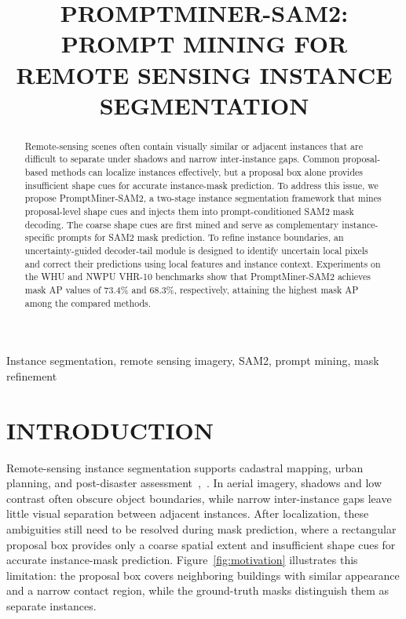 \documentclass{article}
\title{PROMPTMINER-SAM2: PROMPT MINING FOR\\REMOTE SENSING INSTANCE SEGMENTATION}
\begin{document}
\maketitle

\begin{abstract}
Remote-sensing scenes often contain visually similar or adjacent instances that are difficult to separate under shadows and narrow inter-instance gaps.
Common proposal-based methods can localize instances effectively, but a proposal box alone provides insufficient shape cues for accurate instance-mask prediction.
To address this issue, we propose PromptMiner-SAM2, 
a two-stage instance segmentation framework that mines proposal-level shape cues and injects them into prompt-conditioned SAM2 mask decoding.
The coarse shape cues are first mined and serve as complementary instance-specific prompts for SAM2 mask prediction. 
To refine instance boundaries, an uncertainty-guided decoder-tail module is designed to identify uncertain local pixels and correct their predictions using local features and instance context.
Experiments on the WHU and NWPU VHR-10 benchmarks show that PromptMiner-SAM2 achieves
mask AP values of 73.4\% and 68.3\%, respectively, attaining the highest mask AP among the compared
methods.
\end{abstract}
\begin{keywords}
Instance segmentation, remote sensing imagery, SAM2, prompt mining, mask refinement
\end{keywords}

\section{INTRODUCTION}

Remote-sensing instance segmentation supports cadastral mapping, urban planning, and post-disaster assessment~\cite{rsiisn},~\cite{p2pformer}. 
In aerial imagery, shadows and low contrast often obscure object boundaries, while narrow inter-instance gaps leave little visual separation between adjacent instances.
After localization, these ambiguities still need to be resolved during mask prediction, where a rectangular proposal box provides only a coarse spatial extent and insufficient shape cues for accurate instance-mask prediction. 
Figure~\ref{fig:motivation} illustrates this limitation: the proposal box covers neighboring buildings with similar appearance and a narrow contact region, while the ground-truth masks distinguish them as separate instances.
\end{document}
